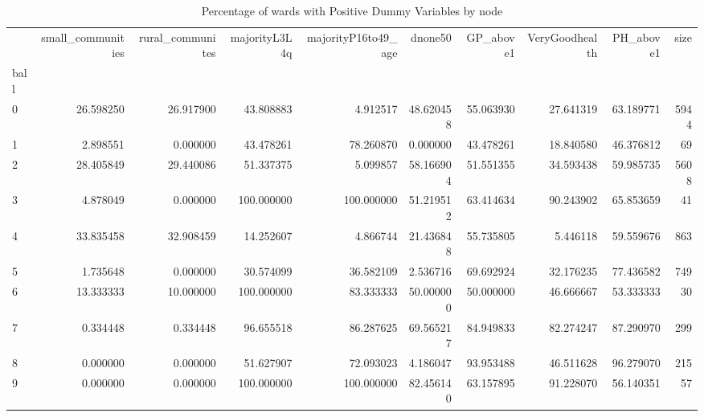 \begin{table}
\centering
\caption{Percentage of wards with Positive Dummy Variables by node}
\label{tab:tdabm_dummy_variable_percentages}
\begin{tabular}{lrrrrrrrrr}
\toprule
{} &  small\_communities &  rural\_communites &  majorityL3L4q &  majorityP16to49\_age &     dnone50 &  GP\_above1 &  VeryGoodhealth &  PH\_above1 &  size \\
ball &                    &                   &                &                      &             &            &                 &            &       \\
\midrule
0    &          26.598250 &         26.917900 &      43.808883 &             4.912517 &   48.620458 &  55.063930 &       27.641319 &  63.189771 &  5944 \\
1    &           2.898551 &          0.000000 &      43.478261 &            78.260870 &    0.000000 &  43.478261 &       18.840580 &  46.376812 &    69 \\
2    &          28.405849 &         29.440086 &      51.337375 &             5.099857 &   58.166904 &  51.551355 &       34.593438 &  59.985735 &  5608 \\
3    &           4.878049 &          0.000000 &     100.000000 &           100.000000 &   51.219512 &  63.414634 &       90.243902 &  65.853659 &    41 \\
4    &          33.835458 &         32.908459 &      14.252607 &             4.866744 &   21.436848 &  55.735805 &        5.446118 &  59.559676 &   863 \\
5    &           1.735648 &          0.000000 &      30.574099 &            36.582109 &    2.536716 &  69.692924 &       32.176235 &  77.436582 &   749 \\
6    &          13.333333 &         10.000000 &     100.000000 &            83.333333 &   50.000000 &  50.000000 &       46.666667 &  53.333333 &    30 \\
7    &           0.334448 &          0.334448 &      96.655518 &            86.287625 &   69.565217 &  84.949833 &       82.274247 &  87.290970 &   299 \\
8    &           0.000000 &          0.000000 &      51.627907 &            72.093023 &    4.186047 &  93.953488 &       46.511628 &  96.279070 &   215 \\
9    &           0.000000 &          0.000000 &     100.000000 &           100.000000 &   82.456140 &  63.157895 &       91.228070 &  56.140351 &    57 \\

\end{tabular}
\end{table}
